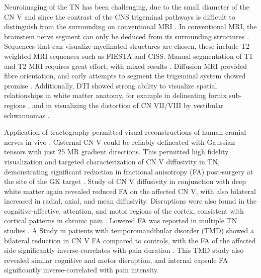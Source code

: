 Neuroimaging of the TN has been challenging, due to the small diameter of the CN V and since the contrast of the CNS trigeminal pathways is difficult to distinguish from the surrounding on conventional MRI \cite{Borges2010}. In conventional MRI, the brainstem nerve segment can only be deduced from its surrounding structures \cite{Casselman2008}. Sequences that can visualize myelinated structures are chosen, these include T2-weighted MRI  sequences such as FIESTA and CISS. Manual segmentation of T1 and T2 MRI requires great effort, with mixed results \cite{Miller2008a}. Diffusion MRI provided fibre orientation, and early attempts to segment the trigeminal system showed promise \cite{Upadhyay2008,Habas2007f}. Additionally, DTI showed strong ability to visualize spatial relationships in white matter anatomy, for example in delineating fornix sub-regions \cite{Chen2015c}, and in visualizing the distortion of CN VII/VIII by vestibular schwannomas \cite{Chen2011b}.  

Application of tractography permitted visual reconstructions of human cranial nerves in vivo \cite{Hodaie2010}. Cisternal CN V could be reliably delineated with Gaussian tensors with just 25 MR gradient directions. This permitted high fidelity visualization and targeted characterization of CN V diffusivity in TN, demonstrating significant reduction in fractional anisotropy (FA) post-surgery at the site of the GK target \cite{Hodaie2009a}. Study of CN V diffusivity in conjunction with deep white matter again revealed reduced FA on the affected CN V, with also bilateral increased in radial, axial, and mean diffusivity. Disruptions were also found in the cognitive-affective, attention, and motor regions of the cortex, consistent with cortical patterns in chronic pain \cite{Desouza2013}. Lowered FA was reported in multiple TN studies \cite{Herweh2007, Lutz2011}. A Study in patients with temporomandibular disorder (TMD) showed a bilateral reduction in CN V FA compared to controls, with the FA of the affected side significantly inverse-correlates with pain duration \cite{Moayedi2012}. This TMD study also revealed similar cognitive and motor disruption, and internal capsule FA significantly inverse-correlated with pain intensity. 